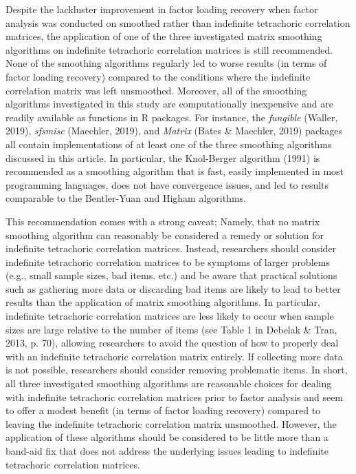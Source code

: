 \documentclass[
  english,
  man]{apa6}
\begin{document}
Despite the lackluster improvement in factor loading recovery when factor analysis was conducted on smoothed rather than indefinite tetrachoric correlation matrices, the application of one of the three investigated matrix smoothing algorithms on indefinite tetrachoric correlation matrices is still recommended. None of the smoothing algorithms regularly led to worse results (in terms of factor loading recovery) compared to the conditions where the indefinite correlation matrix was left unsmoothed. Moreover, all of the smoothing algorithms investigated in this study are computationally inexpensive and are readily available as functions in R packages. For instance, the \emph{fungible} (Waller, 2019), \emph{sfsmisc} (Maechler, 2019), and \emph{Matrix} (Bates \& Maechler, 2019) packages all contain implementations of at least one of the three smoothing algorithms discussed in this article. In particular, the Knol-Berger algorithm (1991) is recommended as a smoothing algorithm that is fast, easily implemented in most programming languages, does not have convergence issues, and led to results comparable to the Bentler-Yuan and Higham algorithms.

This recommendation comes with a strong caveat; Namely, that no matrix smoothing algorithm can reasonably be considered a remedy or solution for indefinite tetrachoric correlation matrices. Instead, researchers should consider indefinite tetrachoric correlation matrices to be symptoms of larger problems (e.g., small sample sizes, bad items. etc.) and be aware that practical solutions such as gathering more data or discarding bad items are likely to lead to better results than the application of matrix smoothing algorithms. In particular, indefinite tetrachoric correlation matrices are less likely to occur when sample sizes are large relative to the number of items (see Table 1 in Debelak \& Tran, 2013, p. 70), allowing researchers to avoid the question of how to properly deal with an indefinite tetrachoric correlation matrix entirely. If collecting more data is not possible, researchers should consider removing problematic items. In short, all three investigated smoothing algorithms are reasonable choices for dealing with indefinite tetrachoric correlation matrices prior to factor analysis and seem to offer a modest benefit (in terms of factor loading recovery) compared to leaving the indefinite tetrachoric correlation matrix unsmoothed. However, the application of these algorithms should be considered to be little more than a band-aid fix that does not address the underlying issues leading to indefinite tetrachoric correlation matrices.
\end{document}
